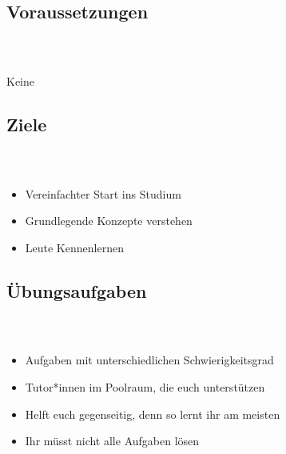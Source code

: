\subsection{Voraussetzungen}
\begin{frame}
	\frametitle{\insertsectionhead \\ {\small \insertsubsectionhead}}
	\centering
	\vspace{2.5cm}
	\Huge Keine
\end{frame}

\subsection{Ziele}
\begin{frame}
	\frametitle{\insertsectionhead \\ {\small \insertsubsectionhead}}
	\begin{itemize}
		\item Vereinfachter Start ins Studium
		\item Grundlegende Konzepte verstehen
		\item Leute Kennenlernen

	\end{itemize}
\end{frame}

\subsection{Übungsaufgaben}
\begin{frame}
	\frametitle{\insertsectionhead \\ {\small \insertsubsectionhead}}
	\begin{itemize}
		\item Aufgaben mit unterschiedlichen Schwierigkeitsgrad
		\item Tutor*innen im Poolraum, die euch unterstützen
		\item Helft euch gegenseitig, denn so lernt ihr am meisten
		\item Ihr müsst nicht alle Aufgaben lösen
	\end{itemize}
\end{frame}

